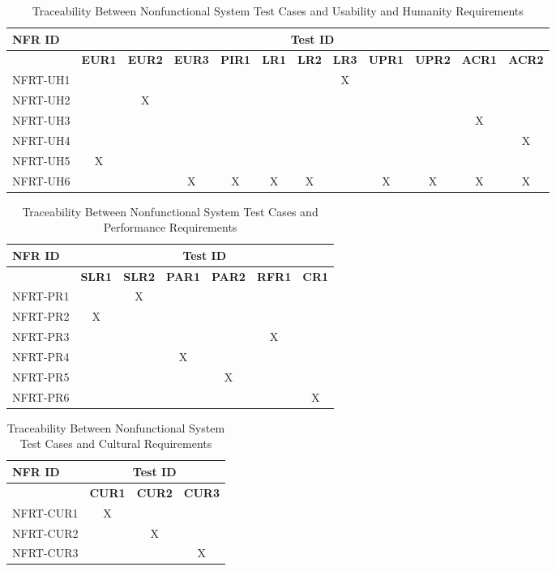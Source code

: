 \documentclass[12pt, titlepage]{article}
\begin{document}
\begin{landscape}
  \begin{longtable}{|l|ccccccccccc|}
		\caption{Traceability Between Nonfunctional System Test Cases and Usability and Humanity Requirements} \\
		\hline
    \textbf{NFR ID}   & \multicolumn{11}{c|}{\textbf{Test ID}} \\
    \hline
    ~ & \textbf{EUR1} & \textbf{EUR2} & \textbf{EUR3} & \textbf{PIR1} & \textbf{LR1} & \textbf{LR2} & \textbf{LR3} & \textbf{UPR1} & \textbf{UPR2} & \textbf{ACR1} & \textbf{ACR2} \\
    \hline
    NFRT-UH1 & ~ & ~ & ~ & ~ & ~ & ~ & X & ~ & ~ & ~ & ~ \\
    NFRT-UH2 & ~ & X & ~ & ~ & ~ & ~ & ~ & ~ & ~ & ~ & ~ \\
    NFRT-UH3 & ~ & ~ & ~ & ~ & ~ & ~ & ~ & ~ & ~ & X & ~ \\
    NFRT-UH4 & ~ & ~ & ~ & ~ & ~ & ~ & ~ & ~ & ~ & ~ & X \\
    NFRT-UH5 & X & ~ & ~ & ~ & ~ & ~ & ~ & ~ & ~ & ~ & ~ \\
    NFRT-UH6 & ~ & ~ & X & X & X & X & ~ & X & X & X & X \\
    \hline
  \end{longtable}

  \newpage

  \begin{longtable}{|l|cccccc|}
		\caption{Traceability Between Nonfunctional System Test Cases and Performance Requirements} \\
		\hline
    \textbf{NFR ID}   & \multicolumn{6}{c|}{\textbf{Test ID}} \\
    \hline
    ~ & \textbf{SLR1} & \textbf{SLR2} & \textbf{PAR1} & \textbf{PAR2} & \textbf{RFR1} & \textbf{CR1} \\
    \hline
    NFRT-PR1 & ~ & X & ~ & ~ & ~ & ~ \\
    NFRT-PR2 & X & ~ & ~ & ~ & ~ & ~ \\
    NFRT-PR3 & ~ & ~ & ~ & ~ & X & ~ \\
    NFRT-PR4 & ~ & ~ & X & ~ & ~ & ~ \\
    NFRT-PR5 & ~ & ~ & ~ & X & ~ & ~ \\
    NFRT-PR6 & ~ & ~ & ~ & ~ & ~ & X \\
    \hline
  \end{longtable}

  \begin{longtable}{|l|ccc|}
		\caption{Traceability Between Nonfunctional System Test Cases and Cultural Requirements} \\
		\hline
    \textbf{NFR ID}   & \multicolumn{3}{c|}{\textbf{Test ID}} \\
    \hline
    ~ & \textbf{CUR1} & \textbf{CUR2} & \textbf{CUR3} \\
    \hline
    NFRT-CUR1 & X & ~ & ~ \\
    NFRT-CUR2 & ~ & X & ~ \\
    NFRT-CUR3 & ~ & ~ & X \\
    \hline
  \end{longtable}


\end{landscape}
\end{document}
